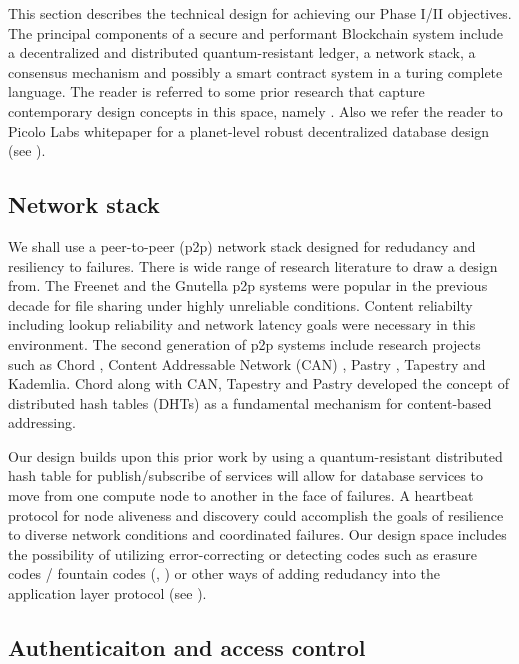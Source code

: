 \label{sec:design} This section describes the technical design for achieving our Phase I/II objectives. The principal
components of a secure and performant Blockchain system include a decentralized and distributed quantum-resistant ledger, a network stack,
a consensus mechanism and possibly a smart contract system in a turing complete language. The reader is referred to some
prior research that capture contemporary design concepts in this space, namely \cite{micali16, garay2015, ava2018}. Also
we refer the reader to Picolo Labs whitepaper for a planet-level robust decentralized database design (see
\cite{picolo2018}).

\subsection{Network stack}

We shall use a peer-to-peer (p2p) network stack designed for redudancy and resiliency to failures. There is wide range of research
literature to draw a design from.  The Freenet \cite{freenet_thesis, Clarke_2001} and the Gnutella \cite{Gnutella} p2p
systems were popular in the previous decade for file sharing under highly unreliable conditions.
Content reliabilty including lookup reliability and network latency goals were necessary in
this environment. The second generation of p2p systems include research projects such as Chord \cite{Stoica_2001},
Content Addressable Network (CAN) \cite{Ratnasamy_2001}, Pastry \cite{Rowstron_2001}, Tapestry \cite{tapestry2004} and
Kademlia. Chord along with CAN, Tapestry and Pastry developed the concept of distributed hash tables (DHTs) as a
fundamental mechanism for content-based addressing.

Our design builds upon this prior work by using a quantum-resistant distributed hash table for
publish/subscribe of services will allow for database services to move from one compute node to another in the face of
failures. A heartbeat protocol for node aliveness and discovery could accomplish the goals of resilience to diverse
network conditions and coordinated failures. Our design space includes the possibility of utilizing error-correcting or
detecting codes such as erasure codes / fountain codes (\cite{byers1998}, \cite{hu2013}) or other ways of adding
redudancy into the application layer protocol (see \cite{bloxroute}).

\subsection{Authenticaiton and access control}

